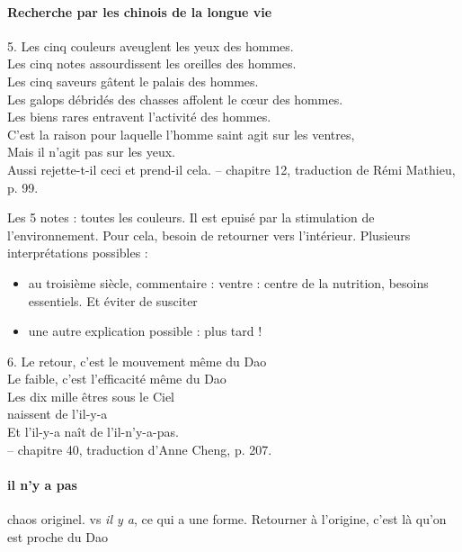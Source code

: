 \paragraph{Recherche par les chinois de la longue vie}

\begin{singlequote}
    5.	Les cinq couleurs aveuglent les yeux des hommes. \\Les cinq notes assourdissent les oreilles des hommes. \\Les cinq saveurs gâtent le palais des hommes.\\
Les galops débridés des chasses affolent le cœur des hommes.\\ Les biens rares entravent l’activité des hommes.\\
C’est la raison pour laquelle l’homme saint agit sur les ventres, \\Mais il n’agit pas sur les yeux.\\
Aussi rejette-t-il ceci et prend-il cela.
-- chapitre 12, traduction de Rémi Mathieu, p. 99.
\end{singlequote}

Les 5 notes : toutes les couleurs. 
Il est epuisé par la stimulation de l'environnement. Pour cela, besoin de retourner vers l'intérieur.
Plusieurs interprétations possibles : 
\begin{itemize}
    \item au troisième siècle, commentaire : ventre : centre de la nutrition, besoins essentiels. Et éviter de susciter
    \item une autre explication possible : plus tard !
\end{itemize}


\begin{singlequote}
    6.	Le retour, c’est le mouvement même du Dao \\Le faible, c’est l’efficacité même du Dao \\
Les dix mille êtres sous le Ciel\\ naissent de l’il-y-a\\
Et l’il-y-a naît de l’il-n’y-a-pas.\\
-- chapitre 40, traduction d’Anne Cheng, p. 207.
\end{singlequote}

\paragraph{il n'y a pas } chaos originel. vs \textit{il y a}, ce qui a une forme.  Retourner à l'origine, c'est là qu'on est proche du Dao



